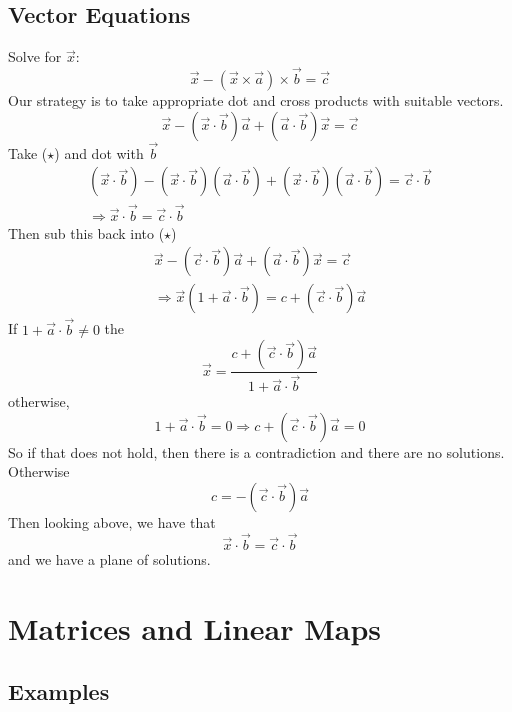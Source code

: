\documentclass{article}
\numberwithin{equation}{section}
\begin{document}
\subsection{Vector Equations}
\begin{eg}
    Solve for $\vec x$: 
    \begin{equation}
        \vec x - (\vec x \times \vec a) \times \vec b = \vec c
    \end{equation}
    Our strategy is to take appropriate dot and cross products with suitable vectors.
    \[
        \vec x - (\vec x \cdot \vec b)\vec a + (\vec a \cdot \vec b) \vec x = \vec c \tag{$\star$}
    \]
    Take ($\star$) and dot with $\vec b$
    \begin{align*}
        (\vec x \cdot \vec b) - (\vec x \cdot \vec b)(\vec a \cdot \vec b) + (\vec x \cdot \vec b)(\vec a \cdot \vec b) = \vec c \cdot \vec b \\
        \Rightarrow \vec x \cdot \vec b = \vec c \cdot \vec b
    \end{align*}
    Then sub this back into ($\star$)
    \begin{align*}
        \vec x - (\vec c \cdot \vec b)\vec a + (\vec a \cdot \vec b) \vec x = \vec c \\
        \Rightarrow \vec x (1 + \vec a \cdot \vec b) = c + (\vec c \cdot \vec b)\vec a
    \end{align*}
    If $1 + \vec a \cdot \vec b \neq 0$ the
    \[
        \vec x = \frac{c + (\vec c \cdot \vec b)\vec a}{1 + \vec a \cdot \vec b} 
    \]
    otherwise, 
    \[
        1 + \vec a \cdot \vec b = 0 \Rightarrow c + (\vec c \cdot \vec b)\vec a = 0
    \]
    So if that does not hold, then there is a contradiction and there are no solutions. Otherwise
    \[
        c = - (\vec c \cdot \vec b)\vec a
    \]
    Then looking above, we have that
    \[
        \vec x \cdot \vec b = \vec c \cdot \vec b
    \]
    and we have a plane of solutions.
\end{eg}

\section{Matrices and Linear Maps}
\subsection{Examples}
\end{document}
